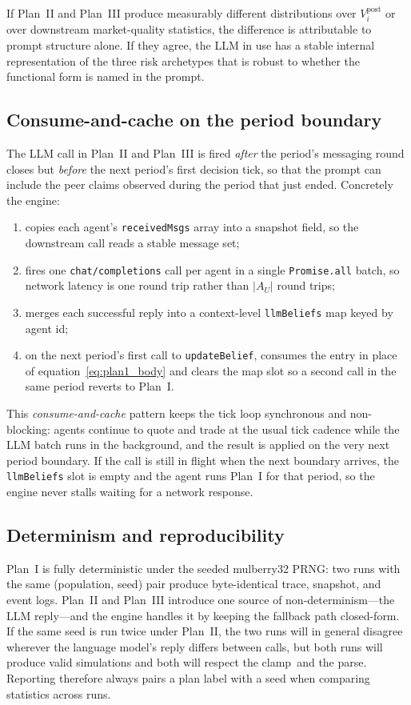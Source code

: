 If Plan~II and Plan~III produce measurably different distributions
over $V_i^{\text{post}}$ or over downstream market-quality
statistics, the difference is attributable to prompt structure
alone. If they agree, the LLM in use has a stable internal
representation of the three risk archetypes that is robust to
whether the functional form is named in the prompt.

\subsection{Consume-and-cache on the period boundary}

The LLM call in Plan~II and Plan~III is fired \emph{after} the
period's messaging round closes but \emph{before} the next period's
first decision tick, so that the prompt can include the peer
claims observed during the period that just ended. Concretely the
engine:
\begin{enumerate}
\item copies each agent's \texttt{receivedMsgs} array into a
snapshot field, so the downstream call reads a stable message set;
\item fires one \texttt{chat/completions} call per agent in a single
\texttt{Promise.all} batch, so network latency is one round trip
rather than $|A_U|$ round trips;
\item merges each successful reply into a context-level
\texttt{llmBeliefs} map keyed by agent id;
\item on the next period's first call to \texttt{updateBelief},
consumes the entry in place of equation~\eqref{eq:plan1_body} and
clears the map slot so a second call in the same period reverts to
Plan~I.
\end{enumerate}
This \emph{consume-and-cache} pattern keeps the tick loop synchronous
and non-blocking: agents continue to quote and trade at the usual
tick cadence while the LLM batch runs in the background, and the
result is applied on the very next period boundary. If the call is
still in flight when the next boundary arrives, the
\texttt{llmBeliefs} slot is empty and the agent runs Plan~I for that
period, so the engine never stalls waiting for a network response.

\subsection{Determinism and reproducibility}

Plan~I is fully deterministic under the seeded mulberry32 PRNG: two
runs with the same (population, seed) pair produce byte-identical
trace, snapshot, and event logs. Plan~II and Plan~III introduce one
source of non-determinism---the LLM reply---and the engine handles
it by keeping the fallback path closed-form. If the same seed is
run twice under Plan~II, the two runs will in general disagree
wherever the language model's reply differs between calls, but
both runs will produce valid simulations and both will respect the
clamp~and the parse. Reporting therefore always pairs a plan label
with a seed when comparing statistics across runs.

